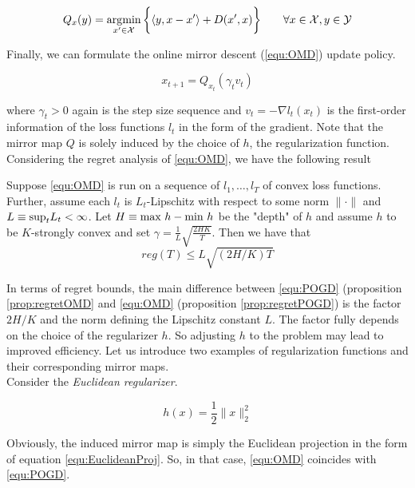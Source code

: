 \begin{equation*}
    Q_x(y) = \operatorname*{\arg\!\min}_{x'\in \mathcal{X}}\bigg\{\langle y,x-x'\rangle + D(x',x)\bigg\} \qquad \forall x\in \mathcal{X}, y \in \mathcal{Y}
\end{equation*}

Finally, we can formulate the online mirror descent (\ref{equ:OMD}) update policy.

\begin{equation*}
    \tag{OMD}
    x_{t+1} = Q_{x_t}(\gamma_t v_t)
    \label{equ:OMD}
\end{equation*}

where $\gamma_t > 0$ again is the step size sequence and $v_t = -\nabla l_t(x_t)$ is the first-order information of the loss functions $l_t$ in the form of the gradient. Note that the mirror map $Q$ is solely induced by the choice of $h$, the regularization function. Considering the regret analysis of \ref{equ:OMD}, we have the following result \cite[Theorem 2.4]{HDRmertikopoulos}

\begin{proposition}\label{prop:regretOMD}
    Suppose \ref{equ:OMD} is run on a sequence of $l_1,\dots,l_T$ of convex loss functions. Further, assume each $l_t$ is $L_t$-Lipschitz with respect to some norm $\|\cdot\|$ and $L \equiv \textnormal{sup}_t L_t < \infty$. Let $H \equiv \textnormal{max } h-\textnormal{min } h$ be the "depth" of $h$ and assume $h$ to be $K$-strongly convex and set $\gamma = \frac{1}{L}\sqrt{\frac{2HK}{T}}$. Then we have that
    \[reg(T) \le L\sqrt{(2H/K)T}\]
\end{proposition}

In terms of regret bounds, the main difference between \ref{equ:POGD} (proposition \ref{prop:regretOMD} and \ref{equ:OMD} (proposition \ref{prop:regretPOGD}) is the factor $2H/K$ and the norm defining the Lipschitz constant $L$. The factor fully depends on the choice of the regularizer $h$. So adjusting $h$ to the problem may lead to improved efficiency. Let us introduce two examples of regularization functions and their corresponding mirror maps. \\

Consider the \textit{Euclidean regularizer}.

\begin{equation*}
    h(x) = \frac{1}{2}\|x\|_2^2
\end{equation*}

Obviously, the induced mirror map is simply the Euclidean projection in the form of equation \ref{equ:EuclideanProj}. So, in that case, \ref{equ:OMD} coincides with \ref{equ:POGD}. 

